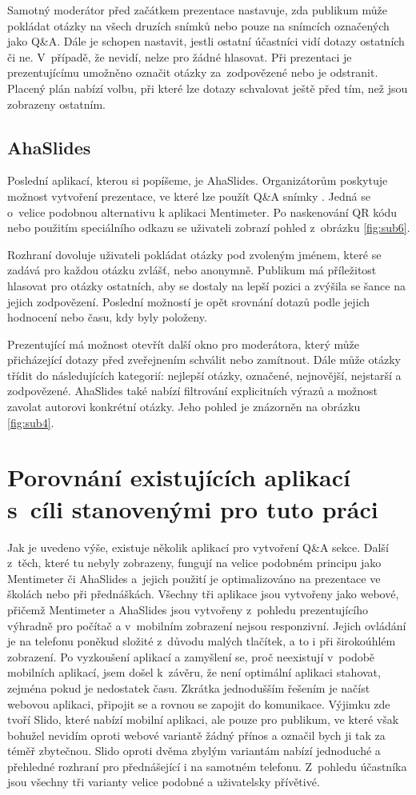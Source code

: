 Samotný moderátor před začátkem prezentace nastavuje, zda publikum může pokládat otázky na všech druzích snímků nebo pouze na snímcích označených jako Q\&A. Dále je schopen nastavit, jestli ostatní účastníci vidí dotazy ostatních či ne. V~případě, že nevidí, nelze pro žádné hlasovat. Při prezentaci je prezentujícímu umožněno označit otázky za~zodpovězené nebo je odstranit. Placený plán nabízí volbu, při které lze dotazy schvalovat ještě před tím, než jsou zobrazeny ostatním.

\subsection{AhaSlides}
Poslední aplikací, kterou si popíšeme, je AhaSlides. Organizátorům poskytuje možnost vytvoření prezentace, ve které lze použít Q\&A snímky \cite{ahasection}. Jedná se o~velice podobnou alternativu k aplikaci Mentimeter. Po naskenování QR kódu nebo použitím speciálního odkazu se uživateli zobrazí pohled z~obrázku \ref{fig:sub6}.

Rozhraní dovoluje uživateli pokládat otázky pod zvoleným jménem, které se zadává pro každou otázku zvlášť, nebo anonymně. Publikum má příležitost hlasovat pro otázky ostatních, aby se dostaly na lepší pozici a zvýšila se šance na jejich zodpovězení. Poslední možností je opět srovnání dotazů podle jejich hodnocení nebo času, kdy byly položeny.

Prezentující má možnost otevřít další okno pro moderátora, který může přicházející dotazy před zveřejnením schválit nebo zamítnout. Dále může otázky třídit do následujících kategorií: nejlepší otázky, označené, nejnovější, nejstarší a zodpovězené. AhaSlides také nabízí filtrování explicitních výrazů a možnost zavolat autorovi konkrétní otázky. Jeho pohled je znázorněn na obrázku \ref{fig:sub4}.

\section{Porovnání existujících aplikací s~cíli stanovenými pro tuto práci}
Jak je uvedeno výše, existuje několik aplikací pro vytvoření Q\&A sekce. Další z~těch, které tu nebyly zobrazeny, fungují na velice podobném principu jako Mentimeter či AhaSlides a~jejich použití je optimalizováno na prezentace ve školách nebo při přednáškách. Všechny tři aplikace jsou vytvořeny jako webové, přičemž Mentimeter a AhaSlides jsou vytvořeny z~pohledu prezentujícího výhradně pro počítač a v~mobilním zobrazení nejsou responzivní. Jejich ovládání je na telefonu poněkud složité z~důvodu malých tlačítek, a to i při širokoúhlém zobrazení. Po vyzkoušení aplikací a zamyšlení se, proč neexistují v~podobě mobilních aplikací, jsem došel k~závěru, že není optimální aplikaci stahovat, zejména pokud je nedostatek času. Zkrátka jednodušším řešením je načíst webovou aplikaci, připojit se a rovnou se zapojit do komunikace. Výjimku zde tvoří Slido, které nabízí mobilní aplikaci, ale pouze pro publikum, ve které však bohužel nevidím oproti webové variantě žádný přínos a označil bych ji tak za téměř zbytečnou. Slido oproti dvěma zbylým variantám nabízí jednoduché a přehledné rozhraní pro přednášející i na samotném telefonu. Z~pohledu účastníka jsou všechny tři varianty velice podobné a uživatelsky přívětivé.

